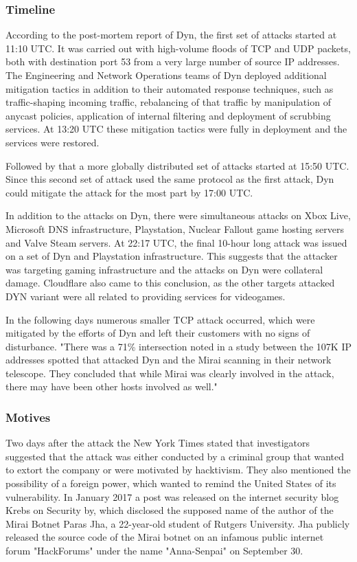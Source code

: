 		\subsubsection{Timeline}
		According to the post-mortem report of Dyn, the first set of attacks started at 11:10 UTC. It was carried out with high-volume floods of TCP and UDP packets, both with destination port 53 from a very large number of source IP addresses. The Engineering and Network Operations teams of Dyn deployed additional mitigation tactics in addition to their automated response techniques, such as traffic-shaping incoming traffic, rebalancing of that traffic by manipulation of anycast policies, application of internal filtering and deployment of scrubbing services. At 13:20 UTC these mitigation tactics were fully in deployment and the services were restored.
		
Followed by that a more globally distributed set of attacks started at 15:50 UTC. Since this second set of attack used the same protocol as the first attack, Dyn could mitigate the attack for the most part by 17:00 UTC.
 
In addition to the attacks on Dyn, there were simultaneous attacks on Xbox Live, Microsoft DNS infrastructure, Playstation, Nuclear Fallout game hosting servers and Valve Steam servers. At 22:17 UTC, the final 10-hour long attack was issued on a set of Dyn and Playstation infrastructure. This suggests that the attacker was targeting gaming infrastructure and the attacks on Dyn were collateral damage. Cloudflare also came to this conclusion, as the other targets attacked DYN variant were all related to providing services for videogames.

In the following days numerous smaller TCP attack occurred, which were mitigated by the efforts of Dyn and left their customers with no signs of disturbance.
"There was a 71\% intersection noted in a study between the 107K IP addresses spotted that attacked Dyn and the Mirai scanning in their network telescope. They concluded that while Mirai was clearly involved in the attack, there may have been other hosts involved as well."

		\subsubsection{Motives}
		Two days after the attack the New York Times stated that investigators suggested that the attack was either conducted by a criminal group that wanted to extort the company or were motivated by hacktivism. They also mentioned the possibility of a foreign power, which wanted to remind the United States of its vulnerability.
In January 2017 a post was released on the internet security blog Krebs on Security by, which disclosed the supposed name of the author of the Mirai Botnet Paras Jha, a 22-year-old student of Rutgers University. Jha publicly released the source code of the Mirai botnet on an infamous public internet forum "HackForums" under the name "Anna-Senpai" on September 30. 

